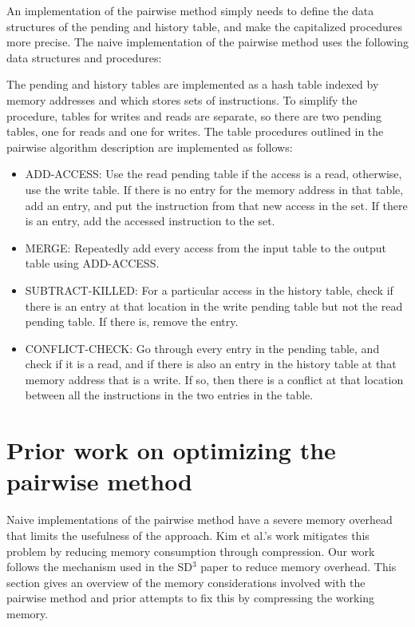 \documentclass[12pt,twoside]{reedthesis}
\begin{document}
		An implementation of the pairwise method simply needs to define the data structures of the pending and history table, and make the capitalized procedures more precise.	
		The naive implementation of the pairwise method uses the following data structures and procedures:
		
		The pending and history tables are implemented as a hash table indexed by memory addresses and which stores sets of instructions. To simplify the procedure, tables for writes and reads are separate, so there are two pending tables, one for reads and one for writes. The table procedures outlined in the pairwise algorithm description are implemented as follows:
		
		\begin{itemize}
			\item ADD-ACCESS: Use the read pending table if the access is a read, otherwise, use the write table. If there is no entry for the memory address in that table, add an entry, and put the instruction from that new access in the set. If there is an entry, add the accessed instruction to the set. 
			\item MERGE: Repeatedly add every access from the input table to the output table using ADD-ACCESS. 
			\item SUBTRACT-KILLED: For a particular access in the history table, check if there is an entry at that location in the write pending table but not the read pending table. If there is, remove the entry. 
			\item CONFLICT-CHECK: Go through every entry in the pending table, and check if it is a read, and if there is also an entry in the history table at that memory address that is a write. If so, then there is a conflict at that location between all the instructions in the two entries in the table. 
		\end{itemize}
		
		
		
	\section{Prior work on optimizing the pairwise method}
		
		Naive implementations of the pairwise method have a severe memory overhead that limits the usefulness of the approach. Kim et al.'s work mitigates this problem by reducing memory consumption through compression. Our work follows the mechanism used in the SD$^3$ paper to reduce memory overhead. This section gives an overview of the memory considerations involved with the pairwise method and prior attempts to fix this by compressing the working memory. 
		
\end{document}
